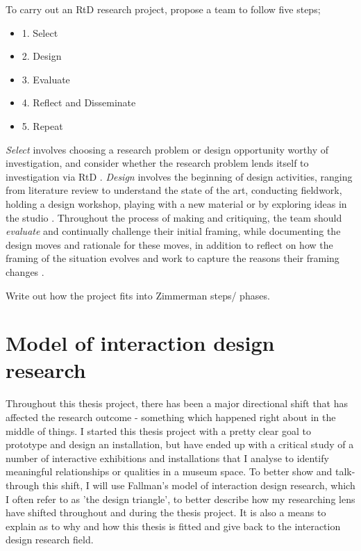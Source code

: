 To carry out an RtD research project, \autocite[]{zimmerman_research_2014} propose a team to follow five steps;
\begin{itemize}
    \item 1. Select
    \item 2. Design
    \item 3. Evaluate
    \item 4. Reflect and Disseminate
    \item 5. Repeat
\end{itemize}


\emph{Select} involves choosing a research problem or design opportunity worthy of investigation, and consider whether the research problem lends itself to investigation via RtD \autocite[p. 185]{zimmerman_research_2014}. \emph{Design} involves the beginning of design activities, ranging from literature review to understand the state of the art, conducting fieldwork, holding a design workshop, playing with a new material or by exploring ideas in the studio \autocite[p. 185]{zimmerman_research_2014}. Throughout the process of making and critiquing, the team should \emph{evaluate} and continually challenge their initial framing, while documenting the design moves and rationale for these moves, in addition to reflect on how the framing of the situation evolves and work to capture the reasons their framing changes \autocite[p. 185]{zimmerman_research_2014}.


Write out how the project fits into Zimmerman steps/ phases.

\section{Model of interaction design research}
Throughout this thesis project, there has been a major directional shift that has affected the research outcome - something which happened right about in the middle of things. I started this thesis project with a pretty clear goal to prototype and design an installation, but have ended up with a critical study of a number of interactive exhibitions and installations that I analyse to identify meaningful relationships or qualities in a museum space. To better show and talk-through this shift, I will use Fallman's model of interaction design research, which I often refer to as 'the design triangle', to better describe how my researching lens have shifted throughout and during the thesis project. It is also a means to explain as to why and how this thesis is fitted and give back to the interaction design research field.

